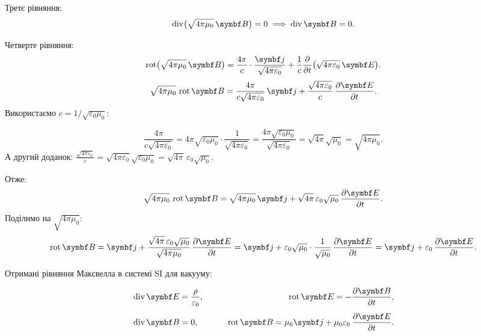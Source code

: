 \documentclass{ConspectBook}
\begin{document}
Третє рівняння:
\begin{equation*}
	\Div\bigl( \sqrt{4\pi\mu_0}\,\Bfield \bigr) = 0 \;\Longrightarrow\; \Div\Bfield = 0.
\end{equation*}

\noindent Четверте рівняння:
\begin{equation*}
	\Rot\bigl( \sqrt{4\pi\mu_0}\,\Bfield \bigr) = \frac{4\pi}{c}\cdot\frac{\vect{j}}{\sqrt{4\pi\varepsilon_0}} + \frac{1}{c}\frac{\partial}{\partial t}\bigl( \sqrt{4\pi\varepsilon_0}\,\Efield \bigr).
\end{equation*}
\begin{equation*}
	\sqrt{4\pi\mu_0}\,\Rot\Bfield = \frac{4\pi}{c\sqrt{4\pi\varepsilon_0}}\,\vect{j} + \frac{\sqrt{4\pi\varepsilon_0}}{c}\,\frac{\partial \Efield}{\partial t}.
\end{equation*}
Використаємо \(c = 1/\sqrt{\varepsilon_0\mu_0}\):

\begin{equation*}
	\frac{4\pi}{c\sqrt{4\pi\varepsilon_0}} = 4\pi\sqrt{\varepsilon_0\mu_0}\cdot\frac{1}{\sqrt{4\pi\varepsilon_0}} = \frac{4\pi\sqrt{\varepsilon_0\mu_0}}{\sqrt{4\pi\varepsilon_0}} = \sqrt{4\pi}\sqrt{\mu_0} = \sqrt{4\pi\mu_0}.
\end{equation*}
А другий доданок: \(\frac{\sqrt{4\pi\varepsilon_0}}{c} = \sqrt{4\pi\varepsilon_0}\sqrt{\varepsilon_0\mu_0} = \sqrt{4\pi}\,\varepsilon_0\sqrt{\mu_0}\).

Отже:
\begin{equation*}
	\sqrt{4\pi\mu_0}\,\Rot\Bfield = \sqrt{4\pi\mu_0}\,\vect{j} + \sqrt{4\pi}\,\varepsilon_0\sqrt{\mu_0}\,\frac{\partial \Efield}{\partial t}.
\end{equation*}
Поділимо на \(\sqrt{4\pi\mu_0}\):
\begin{equation*}
	\Rot\Bfield = \vect{j} + \frac{\sqrt{4\pi}\,\varepsilon_0\sqrt{\mu_0}}{\sqrt{4\pi\mu_0}}\,\frac{\partial \Efield}{\partial t}
	= \vect{j} + \varepsilon_0\sqrt{\mu_0}\cdot\frac{1}{\sqrt{\mu_0}}\,\frac{\partial \Efield}{\partial t}
	= \vect{j} + \varepsilon_0\,\frac{\partial \Efield}{\partial t}.
\end{equation*}

Отримані рівняння Максвелла в системі SI для вакууму:

\begin{equation*}
	\begin{aligned}
		 & \Div\Efield = \frac{\rho}{\varepsilon_0}, \qquad
		 & \Rot\Efield = -\frac{\partial \Bfield}{\partial t},                                    \\[4pt]
		 & \Div\Bfield = 0, \qquad
		 & \Rot\Bfield = \mu_0\vect{j} + \mu_0\varepsilon_0\,\frac{\partial \Efield}{\partial t}.
	\end{aligned}
\end{equation*}
\end{document}
